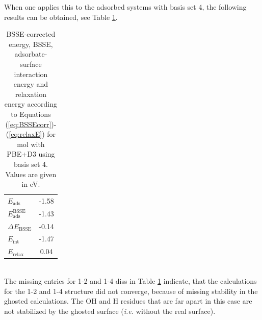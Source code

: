 \documentclass[11pt,DIV=13,BCOR=5mm,a4paper,headinclude]{scrbook}
\begin{document}
When one applies this to the adsorbed systems with basis set 4, the following results can be obtained, see Table \ref{tab:bsse-results}.
\begin{table}[!h]
  \centering
   \caption{BSSE-corrected energy, BSSE, adsorbate-surface interaction energy and relaxation energy according to Equations (\ref{eq:BSSEcorr})-(\ref{eq:relaxE}) for mol with PBE+D3 using basis set 4.
Values are given in eV.}
  \begin{tabular}{l|c}
  \toprule
$E_\textrm{ads}$	&-1.58 \\
$E_\textrm{ads}^\textrm{BSSE}$&-1.43\\ %
$\Delta E_\textrm{BSSE}$&-0.14\\%
$E_\textrm{int}$	&-1.47\\ %
$E_\textrm{relax}$	&0.04 \\\bottomrule%
  \end{tabular}
  \label{tab:bsse-results}
 \end{table}
 \\
 
The missing entries for 1-2 and 1-4 diss in Table \ref{tab:bsse-results} indicate, that the calculations for the 1-2 and 1-4 structure did not converge, because of missing stability in the ghosted calculations.
The OH and H residues that are far apart in this case are not stabilized by the ghosted surface (\textit{i.e.} without the real surface).
\end{document}
